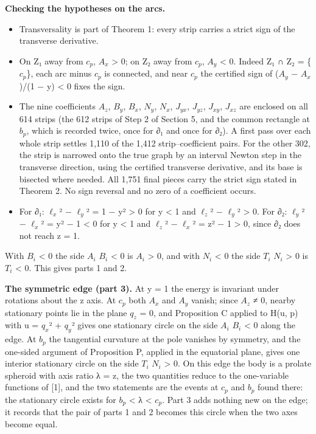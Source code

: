\documentclass[
  11pt,
]{article}
\providecommand{\tightlist}{%
  \setlength{\itemsep}{0pt}\setlength{\parskip}{0pt}}
\begin{document}
\textbf{Checking the hypotheses on the arcs.}

\begin{itemize}
\tightlist
\item
  Transversality is part of Theorem 1: every strip carries a strict sign
  of the transverse derivative.
\item
  On Z₁ away from \(c_{p}\), \(A_{x}\) \textgreater{} 0; on Z₂ away from
  \(c_{p}\), \(A_{y}\) \textless{} 0. Indeed Z₁ ∩ Z₂ = \{\(c_{p}\)\},
  each arc minus \(c_{p}\) is connected, and near \(c_{p}\) the
  certified sign of (\(A_{y}\) − \(A_{x}\))/(1 − y) \textless{} 0 fixes
  the sign.
\item
  The nine coefficients \(A_{z}\), \(B_{y}\), \(B_{x}\), \(N_{y}\),
  \(N_{x}\), \(J_{yx}\), \(J_{yz}\), \(J_{xy}\), \(J_{xz}\) are enclosed
  on all 614 strips (the 612 strips of Step 2 of Section 5, and the
  common rectangle at \(b_{p}\), which is recorded twice, once for ∂₁
  and once for ∂₂). A first pass over each whole strip settles 1,110 of
  the 1,412 strip--coefficient pairs. For the other 302, the strip is
  narrowed onto the true graph by an interval Newton step in the
  transverse direction, using the certified transverse derivative, and
  its base is bisected where needed. All 1,751 final pieces carry the
  strict sign stated in Theorem 2. No sign reversal and no zero of a
  coefficient occurs.
\item
  For ∂₁: \(\ell_{x}\)² − \(\ell_{y}\)² = 1 − y² \textgreater{} 0 for y
  \textless{} 1 and \(\ell_{z}\)² − \(\ell_{y}\)² \textgreater{} 0. For
  ∂₂: \(\ell_{y}\)² − \(\ell_{x}\)² = y² − 1 \textless{} 0 for y
  \textless{} 1 and \(\ell_{z}\)² − \(\ell_{x}\)² = z² − 1
  \textgreater{} 0, since ∂₂ does not reach z = 1.
\end{itemize}

With \(B_{i}\) \textless{} 0 the side \(A_{i}\) \(B_{i}\) \textless{} 0
is \(A_{i}\) \textgreater{} 0, and with \(N_{i}\) \textless{} 0 the side
\(T_{i}\) \(N_{i}\) \textgreater{} 0 is \(T_{i}\) \textless{} 0. This
gives parts 1 and 2.

\textbf{The symmetric edge (part 3).} At y = 1 the energy is invariant
under rotations about the z axis. At \(c_{p}\) both \(A_{x}\) and
\(A_{y}\) vanish; since \(A_{z}\) ≠ 0, nearby stationary points lie in
the plane \(q_{z}\) = 0, and Proposition C applied to H(u, p) with u =
\(q_{x}\)² + \(q_{y}\)² gives one stationary circle on the side
\(A_{i}\) \(B_{i}\) \textless{} 0 along the edge. At \(b_{p}\) the
tangential curvature at the pole vanishes by symmetry, and the one-sided
argument of Proposition P, applied in the equatorial plane, gives one
interior stationary circle on the side \(T_{i}\) \(N_{i}\)
\textgreater{} 0. On this edge the body is a prolate spheroid with axis
ratio λ = z, the two quantities reduce to the one-variable functions of
{[}1{]}, and the two statements are the events at \(c_{p}\) and
\(b_{p}\) found there: the stationary circle exists for \(b_{p}\)
\textless{} λ \textless{} \(c_{p}\). Part 3 adds nothing new on the
edge; it records that the pair of parts 1 and 2 becomes this circle when
the two axes become equal.
\end{document}
